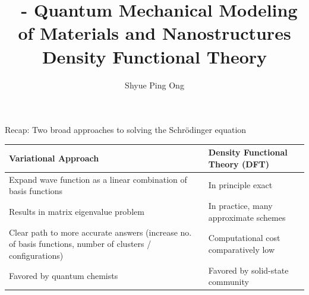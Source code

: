 \documentclass[aspectratio=169]{beamer}
\title[\classname Density Functional Theory]{\classname~- Quantum Mechanical Modeling of Materials and Nanostructures\\Density Functional Theory}
\author{Shyue Ping Ong}
\institute[UCSD]{University of California, San Diego\\
\medskip
}
\date{\classyear} %
\begin{document}
    \begin{frame}
        \titlepage %
    \end{frame}

    \begin{frame}{Recap: Two broad approaches to solving the Schr\"odinger equation}

        \begin{table}[]
            \centering
            \begin{tabular}{p{7cm}|p{7cm}}
                \textbf{Variational Approach}                                                                              & \textbf{Density Functional Theory (DFT)} \\
                \hline\hline
                Expand wave function as a linear combination of basis functions                                            & In principle exact                       \\
                \hline
                Results in matrix eigenvalue problem                                                                       & In practice, many approximate schemes    \\
                \hline
                Clear path to more accurate answers (increase no. of basis functions, number of clusters / configurations) & Computational cost comparatively low\\
                \hline
                Favored by quantum chemists                                                                                & Favored by solid-state community         \\
            \end{tabular}
        \end{table}

    \end{frame}
\end{document}
